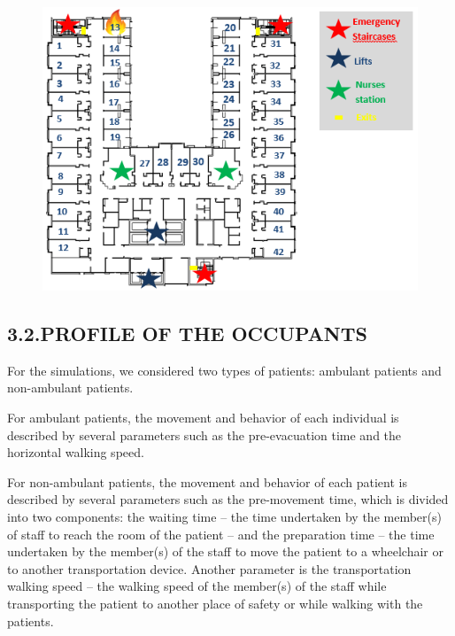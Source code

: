 \documentclass{style/llncs}
\begin{document}
\begin{figure}[tbp]%
\begin{mdcenter}%

\noindent{}\includegraphics[keepaspectratio=true,width=\dimmin{}{\dimwidth{0.90}}]{images/FIG_1}{}%

\mdhr{}%

\noindent{}%
\end{mdcenter}\label{fig-layout}%
\end{figure}%

\subsection{3.2.\hspace*{0.5em}PROFILE OF THE OCCUPANTS}\label{sec-profile-of-the-occupants}%

\noindent{}For the simulations, we considered two types of patients: ambulant
patients and non-ambulant patients.%

For ambulant patients, the movement and behavior of each individual is
described by several parameters such as the pre-evacuation time and the
horizontal walking speed.%

For non-ambulant patients, the movement and behavior of each patient is
described by several parameters such as the pre-movement time, which is
divided into two components: the waiting time – the time undertaken by
the member(s) of staff to reach the room of the patient – and the
preparation time – the time undertaken by the member(s) of the staff to
move the patient to a wheelchair or to another transportation device.
Another parameter is the transportation walking speed – the walking speed
of the member(s) of the staff while transporting the patient to another
place of safety or while walking with the patients.%
\end{document}
